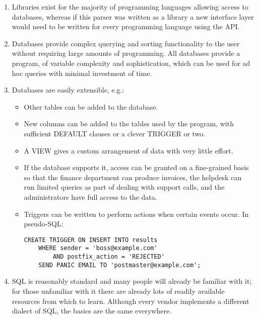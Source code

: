 \documentclass[a4paper,12pt,draft]{article}
\begin{document}
\begin{enumerate}

    \item Libraries exist for the majority of programming languages
        allowing access to databases, whereas if this parser was written
        as a library a new interface layer would need to be written for
        every programming language using the API\@.

    \item Databases provide complex querying and sorting functionality to
        the user without requiring large amounts of programming.  All
        databases provide a program, of variable complexity and
        sophistication, which can be used for ad hoc queries with minimal
        investment of time.

    \item Databases are easily extensible, e.g.:
        
        \begin{itemize}

            \item Other tables can be added to the database.

            \item New columns can be added to the tables used by the
                program, with sufficient DEFAULT clauses or a clever
                TRIGGER or two.

            \item A VIEW gives a custom arrangement of data with very
                little effort.

            \item If the database supports it, access can be granted on a
                fine-grained basis so that the finance department can
                produce invoices, the helpdesk can run limited queries as
                part of dealing with support calls, and the administrators
                have full access to the data.

            \item Triggers can be written to perform actions when certain
                events occur.  In pseudo-SQL\@:

\begin{verbatim}
CREATE TRIGGER ON INSERT INTO results
    WHERE sender = 'boss@example.com'
        AND postfix_action = 'REJECTED'
    SEND PANIC EMAIL TO 'postmaster@example.com';
\end{verbatim}

        \end{itemize}


    \item SQL is reasonably standard and many people will already be
        familiar with it; for those unfamiliar with it there are already
        lots of readily available resources from which to learn.  Although
        every vendor implements a different dialect of SQL, the basics are
        the same everywhere.

\end{enumerate}
\end{document}

